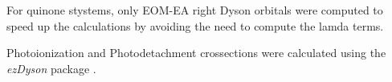 For quinone stystems, only EOM-EA right Dyson orbitals were computed to speed up the calculations by avoiding the need to compute the lamda terms.

Photoionization and Photodetachment crossections were calculated using the \textit{ezDyson} package \cite{gozem2022ezspectra,gozem2015photoionization}.






\cleardoublepage


